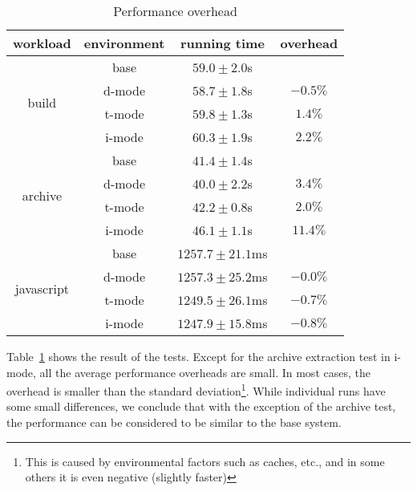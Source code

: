 
\begin{table}[tb]
\centering
\begin{tabular}{|c|c|c|c|}
\hline
workload & environment & running time & overhead \\ \hline \hline
\multirow{4}{*}{build} &
  base   & $59.0\pm2.0$s & \\ \cline{2-4}
& d-mode & $58.7\pm1.8$s & $-0.5\%$ \\ \cline{2-4}
& t-mode & $59.8\pm1.3$s & $1.4\%$ \\ \cline{2-4}
& i-mode & $60.3\pm1.9$s & $2.2\%$ \\ \hline
\multirow{4}{*}{archive} &
  base   & $41.4\pm1.4$s & \\ \cline{2-4}
& d-mode & $40.0\pm2.2$s & $3.4\%$ \\ \cline{2-4}
& t-mode & $42.2\pm0.8$s & $2.0\%$ \\ \cline{2-4}
& i-mode & $46.1\pm1.1$s & $11.4\%$ \\ \hline
\multirow{4}{*}{javascript} &
  base   & $1257.7\pm21.1$ms & \\ \cline{2-4}
& d-mode & $1257.3\pm25.2$ms & $-0.0\%$ \\ \cline{2-4}
& t-mode & $1249.5\pm26.1$ms & $-0.7\%$ \\ \cline{2-4}
& i-mode & $1247.9\pm15.8$ms & $-0.8\%$ \\ \hline
\end{tabular}
\caption{Performance overhead}
\label{table:binint-benchmark}
\end{table}

Table~\ref{table:binint-benchmark} shows the result of the tests.
Except for the archive extraction test in i-mode,
all the average performance overheads are small.
In most cases, the overhead is smaller than the standard deviation\footnote{
This is caused by environmental factors such as caches, etc., and in some
others it is even negative (slightly faster)}.
While individual runs have some small differences, we conclude that
with the exception of the archive test, the performance can be considered to
be similar to the base system.

